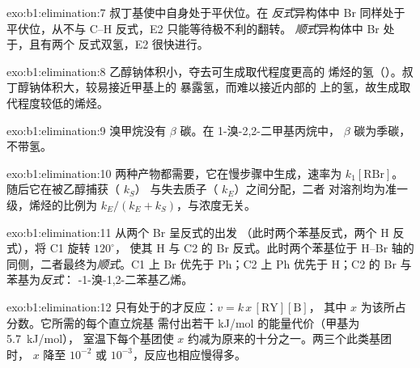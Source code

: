 \begin{solution}{exo:b1:elimination:7}
叔丁基使中自身处于平伏位。在
\textit{反式}异构体中 Br 同样处于平伏位，从不与
C--H 反式，E2 只能等待极不利的翻转。
\textit{顺式}异构体中 Br 处于，且有两个
反式双氢，E2 很快进行。
\end{solution}

\begin{solution}{exo:b1:elimination:8}
乙醇钠体积小，夺去可生成取代程度更高的
烯烃的氢（）。叔丁醇钠体积大，较易接近甲基上的
暴露氢，而难以接近内部的
上的氢，故生成取代程度较低的烯烃。
\end{solution}

\begin{solution}{exo:b1:elimination:9}
溴甲烷没有 $\beta$ 碳。在 1-溴-2,2-二甲基丙烷中，
$\beta$ 碳为季碳，不带氢。
\end{solution}

\begin{solution}{exo:b1:elimination:10}
两种产物都需要，它在慢步骤中生成，速率为
$k_1[\mathrm{RBr}]$。随后它在被乙醇捕获（ $k_S$）
与失去质子（ $k_E$）之间分配，二者
对溶剂均为准一级，烯烃的比例为
$k_E/(k_E + k_S)$，与浓度无关。
\end{solution}

\begin{solution}{exo:b1:elimination:11}
从两个 Br 呈反式的出发
（此时两个苯基反式，两个 H 反式），将 C1 旋转 $120^\circ$，
使其 H 与 C2 的 Br 反式。此时两个苯基位于
H--Br 轴的同侧，二者最终为\textit{顺式}。C1 上 Br 优先于
Ph；C2 上 Ph 优先于 H；C2 的 Br 与苯基为\textit{反式}：
-1-溴-1,2-二苯基乙烯。
\end{solution}

\begin{solution}{exo:b1:elimination:12}
只有处于的才反应：$v = k\,x\,[\mathrm{RY}][\mathrm{B}]$，
其中 $x$ 为该所占分数。它所需的每个直立烷基
需付出若干 kJ/mol 的能量代价（甲基为 \qty{5.7}{kJ/mol}），
室温下每个基团使 $x$ 约减为原来的十分之一。两三个此类基团时，
$x$ 降至 $10^{-2}$ 或 $10^{-3}$，反应也相应慢得多。
\end{solution}

